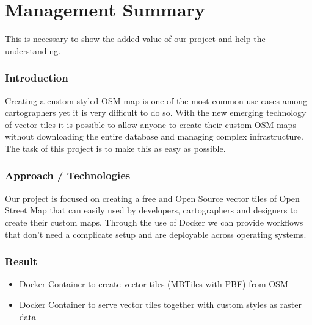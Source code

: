 
\begingroup
\let\clearpage\relax
\let\cleardoublepage\relax
\let\cleardoublepage\relax

\chapter*{Management Summary}
\label{management-summary}

This is necessary to show the added value of our project and help the understanding.



\subsection*{Introduction}\label{introduction}

Creating a custom styled OSM map is one of the most common use cases
among cartographers yet it is very difficult to do so. With the new
emerging technology of vector tiles it is possible to allow anyone to
create their custom OSM maps without downloading the entire database and
managing complex infrastructure. The task of this project is to make
this as easy as possible.

\subsection*{Approach / Technologies}

Our project is focused on creating a free and Open Source vector tiles
of Open Street Map that can easily used by developers, cartographers and
designers to create their custom maps.
\newline{}
Through the use of Docker we can provide workflows that don't need a
complicate setup and are deployable across operating systems.

\subsection*{Result}

\begin{itemize}
\item
  Docker Container to create vector tiles (MBTiles with PBF) from OSM
\item
  Docker Container to serve vector tiles together with custom styles as
  raster data
\end{itemize}

\endgroup			
\vfill
